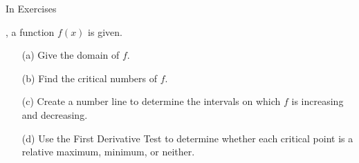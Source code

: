 {\noindent In Exercises}
{, a function $f(x)$ is given.
	\begin{enumerate}
	\item	[(a)] Give the domain of $f$.
	\item	[(b)] Find the critical numbers of $f$.
	\item	[(c)] Create a number line to determine the intervals on which $f$ is increasing and decreasing.
	\item	[(d)] Use the First Derivative Test to determine whether each critical point is a relative maximum, minimum, or neither.
	\end{enumerate}
}
